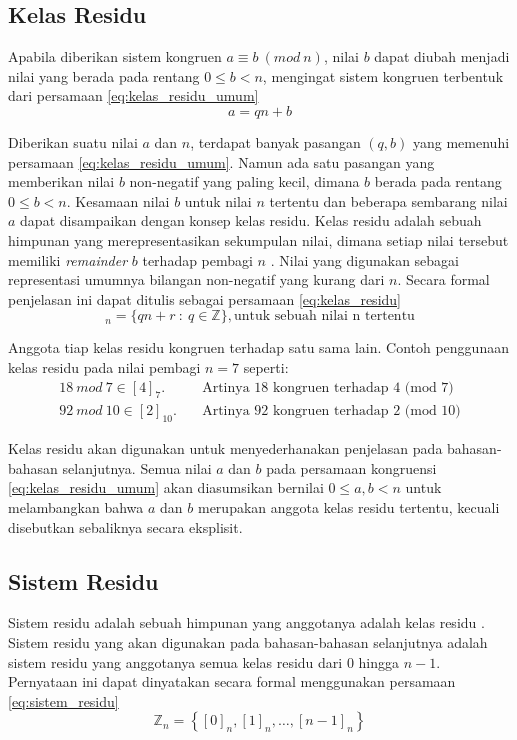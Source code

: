 \subsection{Kelas Residu}
Apabila diberikan sistem kongruen $a\equiv b\ (mod\ n)$, nilai $b$ dapat diubah menjadi nilai yang berada pada rentang $0\le b<n$, mengingat sistem kongruen terbentuk dari persamaan \eqref{eq:kelas_residu_umum}
\begin{equation}
a=qn+b
\label{eq:kelas_residu_umum}
\end{equation}

Diberikan suatu nilai $a$ dan $n$, terdapat banyak pasangan $(q,b)$ yang memenuhi persamaan \eqref{eq:kelas_residu_umum}. Namun ada satu pasangan yang memberikan nilai $b$ non-negatif yang paling kecil, dimana $b$ berada pada rentang $0\le b<n$. Kesamaan nilai $b$ untuk nilai $n$ tertentu dan beberapa sembarang nilai $a$ dapat disampaikan dengan konsep kelas residu.
Kelas residu adalah sebuah himpunan yang merepresentasikan sekumpulan nilai, dimana setiap nilai tersebut memiliki \textit{remainder} $b$ terhadap pembagi $n$ \cite{cormen_introduction,stallings_cryptography}. Nilai yang digunakan sebagai representasi umumnya bilangan non-negatif yang kurang dari $n$. Secara formal penjelasan ini dapat ditulis sebagai persamaan \eqref{eq:kelas_residu}
\begin{equation}
[r]_n=\{qn+r\ :\ q\in \mathbb{Z}\}, \text{untuk sebuah nilai n tertentu}
\label{eq:kelas_residu}
\end{equation}

Anggota tiap kelas residu kongruen terhadap satu sama lain. Contoh penggunaan kelas residu pada nilai pembagi $n = 7$ seperti:
\begin{align*}
18\ mod\ 7\in [4]_7. \quad& \text{Artinya 18 kongruen terhadap 4 (mod 7)} \\
92\ mod\ 10\in [2]_{10}. \quad& \text{Artinya 92 kongruen terhadap 2 (mod 10)}
\end{align*}

Kelas residu akan digunakan untuk menyederhanakan penjelasan pada bahasan-bahasan selanjutnya. Semua nilai $a$ dan $b$ pada persamaan kongruensi \eqref{eq:kelas_residu_umum} akan diasumsikan bernilai $0\leq a,b < n$ untuk melambangkan bahwa $a$ dan $b$ merupakan anggota kelas residu tertentu, kecuali disebutkan sebaliknya secara eksplisit.

\subsection{Sistem Residu}
Sistem residu adalah sebuah himpunan yang anggotanya adalah kelas residu \cite{stallings_cryptography,cormen_introduction}. Sistem residu yang akan digunakan pada bahasan-bahasan selanjutnya adalah sistem residu yang anggotanya semua kelas residu dari 0 hingga $n - 1$. Pernyataan ini dapat dinyatakan secara formal menggunakan persamaan \eqref{eq:sistem_residu}
\begin{equation}
\mathbb{Z}_n=\left\lbrace[0]_n,[1]_n,\dots,[n-1]_n\right\rbrace
\label{eq:sistem_residu}
\end{equation}


